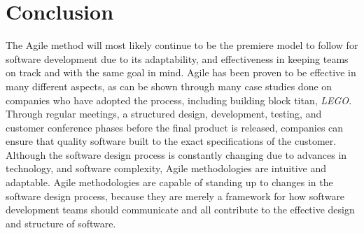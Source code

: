 \documentclass[conference]{IEEEtran}
\begin{document}
\section{Conclusion}
The Agile method will most likely continue to be the premiere model to follow for software development due to its adaptability, and effectiveness in keeping teams on track and with the same goal in mind.  Agile has been proven to be effective in many different aspects, as can be shown through many case studies done on companies who have adopted the process, including building block titan, \textit{LEGO}.  Through regular meetings, a structured design, development, testing, and customer conference phases before the final product is released, companies can ensure that quality software built to the exact specifications of the customer.  Although the software design process is constantly changing due to advances in technology, and software complexity, Agile methodologies are intuitive and adaptable.  Agile methodologies are capable of standing up to changes in the software design process, because they are merely a framework for how software development teams should communicate and all contribute to the effective design and structure of software.



\end{document}
